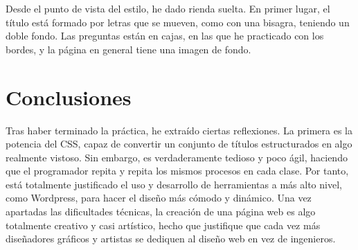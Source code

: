 Desde el punto de vista del estilo, he dado rienda suelta. En primer lugar, el título está formado por letras que se mueven, como con una bisagra, teniendo un doble fondo. Las preguntas están en cajas, en las que he practicado con los bordes, y la página en general tiene una imagen de fondo.


\section{Conclusiones}

Tras haber terminado la práctica, he extraído ciertas reflexiones. La primera es la potencia del CSS, capaz de convertir un conjunto de títulos estructurados en algo realmente vistoso. Sin embargo, es verdaderamente tedioso y poco ágil, haciendo que el programador repita y repita los mismos procesos en cada clase. Por tanto, está totalmente justificado el uso y desarrollo de herramientas a más alto nivel, como Wordpress, para hacer el diseño más cómodo y dinámico. Una vez apartadas las dificultades técnicas, la creación de una página web es algo totalmente creativo y casi artístico, hecho que justifique que cada vez más diseñadores gráficos y artistas se dediquen al diseño web en vez de ingenieros.


\newpage




	
